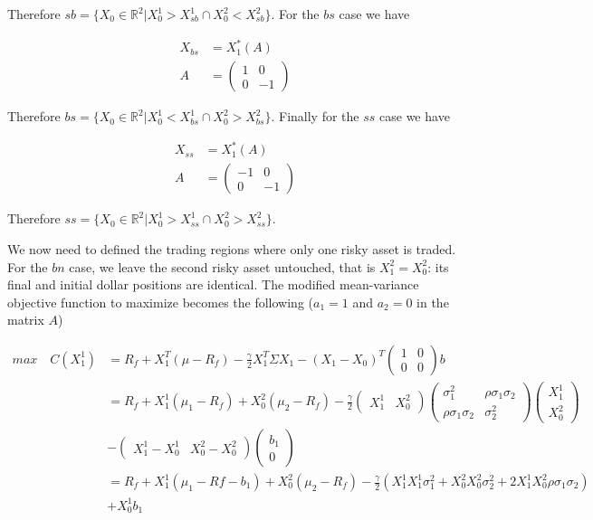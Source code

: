 \documentclass[10pt]{article}
\begin{document}
Therefore $sb = \{X_0 \in \mathbb{R}^2 \vert X_0^1 > X_{sb}^1 \cap  X_0^2 < X_{sb}^2\}$. For the $bs$ case we have 

\begin{align*}
		X_{bs} &= X_1^*(A) \\
	A &=  \begin{pmatrix}
	1 & 0\\	
	0 & -1
\end{pmatrix}
\end{align*}

Therefore $bs = \{X_0 \in \mathbb{R}^2 \vert X_0^1 < X_{bs}^1 \cap  X_0^2 > X_{bs}^2\}$. Finally for the $ss$ case we have 

\begin{align*}
		X_{ss} &= X_1^*(A) \\
	A &=  \begin{pmatrix}
	-1 & 0\\	
	0 & -1
\end{pmatrix}
\end{align*}

Therefore $ss = \{ X_0 \in \mathbb{R}^2 \vert X_0^1 > X_{ss}^1 \cap  X_0^2 > X_{ss}^2\}$.

\bigbreak

We now need to defined the trading regions where only one risky asset is traded. For the $bn$ case, we leave the second risky asset untouched, that is $X_1^2 = X_0^2$: its final and initial dollar positions are identical. The modified mean-variance objective function to maximize becomes the following ($a_1 = 1$ and $a_2 = 0$ in the matrix $A$)

\begin{align*}
	max \quad C(X_1^1) &= R_f + X_1^T(\mu - R_f) - \frac{\gamma}{2}X_1^T\Sigma X_1 - (X_1 - X_0)^T \begin{pmatrix}
	1 & 0\\	
	0 & 0
\end{pmatrix} b \\
&= R_f + X_1^1(\mu_1 - R_f) + X_0^2(\mu_2 - R_f) - \frac{\gamma}{2}  \begin{pmatrix}
	X_1^1 & X_0^2
\end{pmatrix} \begin{pmatrix}
	\sigma_1^2 & \rho \sigma_1 \sigma_2\\	
	\rho \sigma_1 \sigma_2 & \sigma_2^2
\end{pmatrix} \begin{pmatrix}
	X_1^1 \\	
	X_0^2 
\end{pmatrix} \\
& - \begin{pmatrix}
	X_1^1 - X_0^1 & X_0^2 - X_0^2
\end{pmatrix} \begin{pmatrix}
	b_1 \\	
	0 
\end{pmatrix}\\
&= R_f + X_1^1(\mu_1 - Rf - b_1) + X_0^2(\mu_2 - R_f) - \frac{\gamma}{2}\left( X_1^1 X_1^1 \sigma_1^2 + X_0^2 X_0^2 \sigma_2^2 + 2 X_1^1X_0^2\rho \sigma_1 \sigma_2 \right)\\
	& + X_0^1b_1
\end{align*}
\end{document}
